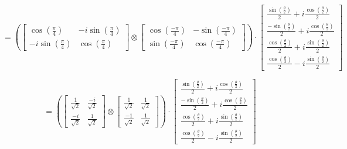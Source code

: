\documentclass{article}
\begin{document}
\[
	=
	\left(
	\begin{bmatrix}
			\cos \left(\frac{\pi}{4}\right)    & -i \sin \left(\frac{\pi}{4}\right) \\
			-i \sin \left(\frac{\pi}{4}\right) & \cos \left(\frac{\pi}{4}\right)
		\end{bmatrix}
	\otimes
	\begin{bmatrix}
			\cos \left(\frac{-\pi}{4}\right) & - \sin \left(\frac{-\pi}{4}\right) \\
			\sin \left(\frac{-\pi}{4}\right) & \cos \left(\frac{-\pi}{4}\right)
		\end{bmatrix}
	\right)
	\cdot
	\begin{bmatrix}
		\frac{\sin \left(\frac{\theta}{2}\right)}{2} + i \frac{\cos \left(\frac{\theta}{2}\right)}{2}  \\
		\frac{-\sin \left(\frac{\theta}{2}\right)}{2} + i \frac{\cos \left(\frac{\theta}{2}\right)}{2} \\
		\frac{\cos \left(\frac{\theta}{2}\right)}{2} + i \frac{\sin \left(\frac{\theta}{2}\right)}{2}  \\
		\frac{\cos \left(\frac{\theta}{2}\right)}{2} - i \frac{\sin \left(\frac{\theta}{2}\right)}{2}
	\end{bmatrix}
\]

\[
	=
	\left(
	\begin{bmatrix}
			\frac{1}{\sqrt{2}}  & \frac{-i}{\sqrt{2}} \\
			\frac{-i}{\sqrt{2}} & \frac{1}{\sqrt{2}}
		\end{bmatrix}
	\otimes
	\begin{bmatrix}
			\frac{1}{\sqrt{2}}  & \frac{1}{\sqrt{2}} \\
			\frac{-1}{\sqrt{2}} & \frac{1}{\sqrt{2}}
		\end{bmatrix}
	\right)
	\cdot
	\begin{bmatrix}
		\frac{\sin \left(\frac{\theta}{2}\right)}{2} + i \frac{\cos \left(\frac{\theta}{2}\right)}{2}  \\
		\frac{-\sin \left(\frac{\theta}{2}\right)}{2} + i \frac{\cos \left(\frac{\theta}{2}\right)}{2} \\
		\frac{\cos \left(\frac{\theta}{2}\right)}{2} + i \frac{\sin \left(\frac{\theta}{2}\right)}{2}  \\
		\frac{\cos \left(\frac{\theta}{2}\right)}{2} - i \frac{\sin \left(\frac{\theta}{2}\right)}{2}
	\end{bmatrix}
\]
\end{document}
